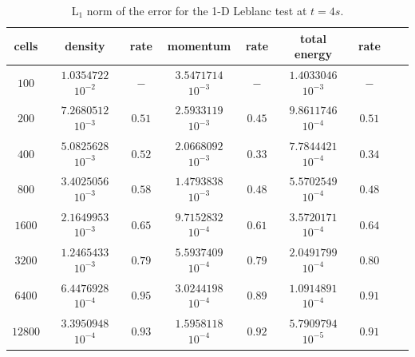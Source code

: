 \documentclass[review,10pt]{elsarticle}
\begin{document}
\begin{table}[!htbp]
\begin{center}
 \caption{\label{tbl:l1_norm_leblanc} L$_1$ norm of the error for the 1-D Leblanc test at $t=4s$.}
 \begin{tabular}{|c|c|c|c|c|c|c|c|c|}
 \hline
  cells & density               & rate         & momentum              & rate          & total energy          & rate         \\  \hline
$100$   & $1.0354722$ $10^{-2}$ & $-$          & $3.5471714$ $10^{-3}$ & $-$           & $1.4033046$ $10^{-3}$ & $-$          \\  \hline
$200$   & $7.2680512$ $10^{-3}$ & $0.51$ & $2.5933119$ $10^{-3}$ & $0.45$  & $9.8611746$ $10^{-4}$ & $0.51$  \\  \hline
$400$   & $5.0825628$ $10^{-3}$ & $0.52$ & $2.0668092$ $10^{-3}$ & $0.33$  & $7.7844421$ $10^{-4}$ & $0.34$ \\  \hline
$800$   & $3.4025056$ $10^{-3}$ & $0.58$ & $1.4793838$ $10^{-3}$ & $0.48$  & $5.5702549$ $10^{-4}$ & $0.48$ \\  \hline
$1600$  & $2.1649953$ $10^{-3}$ & $0.65$ & $9.7152832$ $10^{-4}$ & $0.61$   & $3.5720171$ $10^{-4}$ & $0.64$ \\  \hline
$3200$  & $1.2465433$ $10^{-3}$ & $0.79$ & $5.5937409$ $10^{-4}$ & $0.79$  & $2.0491799$ $10^{-4}$ & $0.80$ \\  \hline
$6400$  & $6.4476928$ $10^{-4}$ & $0.95$ & $3.0244198$ $10^{-4}$ & $0.89$  & $1.0914891$ $10^{-4}$ & $0.91$ \\  \hline
$12800$ & $3.3950948$ $10^{-4}$ & $0.93$ & $1.5958118$ $10^{-4}$ & $0.92$   & $5.7909794$ $10^{-5}$ & $0.91$ \\  \hline
 \end{tabular}
\end{center}
\end{table}
%
\end{document}
